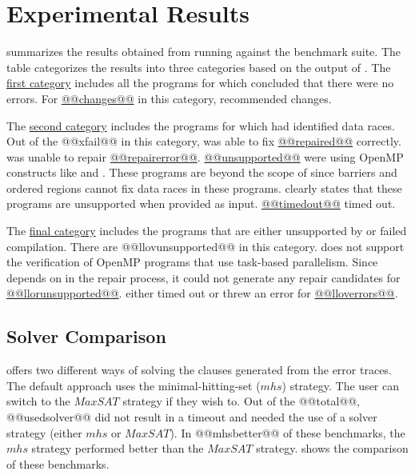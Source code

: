 \section{Experimental Results}
 summarizes the results obtained from running \tool against the benchmark suite. The table categorizes the results into three categories based on the output of \verifier. The \hyperlink{racefree}{first category} includes all the programs for which \verifier concluded that there were no errors. For \hyperlink{racefree_changes}{@@changes@@} in this category, \tool recommended changes.

The \hyperlink{racedetected}{second category} includes the programs for which \verifier had identified data races. Out of the @@xfail@@ in this category, \tool was able to fix \hyperlink{repaired}{@@repaired@@} correctly. \tool was unable to repair \hyperlink{repairerror}{@@repairerror@@}. \hyperlink{unsupported}{@@unsupported@@} were using OpenMP constructs like  and . These programs are beyond the scope of \tool since barriers and ordered regions cannot fix data races in these programs. \tool clearly states that these programs are unsupported when provided as input. \hyperlink{timedout}{@@timedout@@} timed out.

The \hyperlink{llovunsupported}{final category} includes the programs that are either unsupported by \verifier or failed compilation. There are @@llovunsupported@@ in this category. \verifier does not support the verification of OpenMP programs that use task-based parallelism. Since \tool depends on \verifier in the repair process, it could not generate any repair candidates for \hyperlink{llorunsupported}{@@llorunsupported@@}. \verifier either timed out or threw an error for \hyperlink{lloverrors}{@@lloverrors@@}.
 


\subsection{Solver Comparison}

\tool offers two different ways of solving the clauses generated from the error traces. The default approach uses the minimal-hitting-set ($mhs$) strategy. The user can switch to the $MaxSAT$ strategy if they wish to. Out of the @@total@@, @@usedsolver@@ did not result in a timeout and needed the use of a solver strategy (either $mhs$ or $MaxSAT$). In @@mhsbetter@@ of these benchmarks, the $mhs$ strategy performed better than the $MaxSAT$ strategy.  shows the comparison of these benchmarks.


